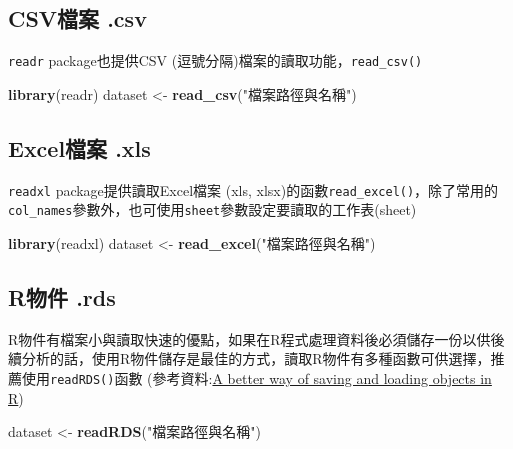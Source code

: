 \documentclass[]{book}
\newenvironment{Shaded}{\begin{snugshade}}{\end{snugshade}}
\newcommand{\KeywordTok}[1]{\textcolor[rgb]{0.13,0.29,0.53}{\textbf{{#1}}}}
\newcommand{\StringTok}[1]{\textcolor[rgb]{0.31,0.60,0.02}{{#1}}}
\newcommand{\NormalTok}[1]{{#1}}
\theoremstyle{definition}
\theoremstyle{definition}
\theoremstyle{remark}
\begin{document}
\subsection{CSV檔案 .csv}\label{csv}

\texttt{readr} \citep{R-readr} package也提供CSV
(逗號分隔)檔案的讀取功能，\texttt{read\_csv()}

\begin{Shaded}
\begin{Highlighting}[]
\KeywordTok{library}\NormalTok{(readr)}
\NormalTok{dataset <-}\StringTok{ }\KeywordTok{read_csv}\NormalTok{(}\StringTok{"檔案路徑與名稱"}\NormalTok{)}
\end{Highlighting}
\end{Shaded}

\subsection{Excel檔案 .xls}\label{excel-.xls}

\texttt{readxl} \citep{R-readxl} package提供讀取Excel檔案 (xls,
xlsx)的函數\texttt{read\_excel()}，除了常用的\texttt{col\_names}參數外，也可使用\texttt{sheet}參數設定要讀取的工作表(sheet)

\begin{Shaded}
\begin{Highlighting}[]
\KeywordTok{library}\NormalTok{(readxl)}
\NormalTok{dataset <-}\StringTok{ }\KeywordTok{read_excel}\NormalTok{(}\StringTok{"檔案路徑與名稱"}\NormalTok{)}
\end{Highlighting}
\end{Shaded}

\subsection{R物件 .rds}\label{r-.rds}

R物件有檔案小與讀取快速的優點，如果在R程式處理資料後必須儲存一份以供後續分析的話，使用R物件儲存是最佳的方式，讀取R物件有多種函數可供選擇，推薦使用\texttt{readRDS()}函數
(參考資料:\href{http://www.fromthebottomoftheheap.net/2012/04/01/saving-and-loading-r-objects/}{A
better way of saving and loading objects in R})

\begin{Shaded}
\begin{Highlighting}[]
\NormalTok{dataset <-}\StringTok{ }\KeywordTok{readRDS}\NormalTok{(}\StringTok{"檔案路徑與名稱"}\NormalTok{)}
\end{Highlighting}
\end{Shaded}
\end{document}
